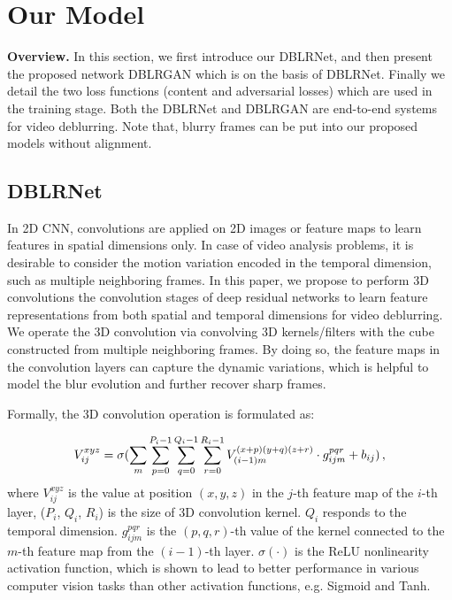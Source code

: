 \documentclass[journal]{IEEEtran}
\begin{document}
\section{Our Model}

\textbf{Overview.} In this section, we first introduce our DBLRNet, and then present the proposed network DBLRGAN which is on the basis of DBLRNet. Finally we detail the two loss functions (content and adversarial losses) which are used in the training stage. Both the DBLRNet and DBLRGAN are end-to-end systems for video deblurring. Note that, blurry frames can be put into our proposed models without alignment.

\subsection{DBLRNet}

\noindent In 2D CNN, convolutions are applied on 2D images or feature maps to learn features in spatial dimensions only. In case of video analysis problems, it is desirable to consider the motion variation encoded in the temporal dimension, such as multiple neighboring frames. In this paper, we propose to perform 3D convolutions \cite{ji20133d} the convolution stages of deep residual networks to learn feature representations from both spatial and temporal dimensions for video deblurring. We operate the 3D convolution via convolving 3D kernels/filters with the cube constructed from multiple neighboring frames. By doing so, the feature maps in the convolution layers can capture the dynamic variations, which is helpful to model the blur evolution and further recover sharp frames.

Formally, the 3D convolution operation is formulated as:

\begin{equation}
\footnotesize
V_{ij}^{xyz} = \sigma (\sum\limits_m {\sum\limits_{p = 0}^{{P_i} - 1} {\sum\limits_{q = 0}^{{Q_i} - 1} {\sum\limits_{r = 0}^{{R_i} - 1} {V_{(i - 1)m}^{(x + p)(y + q)(z + r)} \cdot g_{ijm}^{pqr}}  + {b_{ij}}} } } ) \, ,
\end{equation}
where $V_{ij}^{xyz}$ is the value at position $(x,y,z)$ in the $j$-th feature map of the $i$-th layer, (${P_i}$, ${Q_i}$, ${R_i}$) is the size of 3D convolution kernel. ${Q_i}$ responds to the temporal dimension. $g_{ijm}^{pqr}$ is the $(p,q,r)$-th value of the kernel connected to the $m$-th feature map from the $(i-1)$-th layer. $\sigma\left(\cdot\right)$ is the ReLU nonlinearity activation function, which is shown to lead to better performance in various computer vision tasks than other activation functions, e.g. Sigmoid and Tanh.
\end{document}
